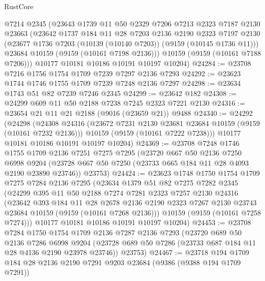 \begin{lexlean}{RustCore}
\begin{coremodule}
      @7214
      @2345
      (@23643
        @1739
        @11
        @50
        @2329
        @7206
        @7213
        @2323
        @7187
        @2130
        @23663
        (@23642
          @1737
          @184
          @11
          @28
          @7203
          @2136
          @2190
          @2323
          @7197
          @2130
          (@23677 @1736 @7203 (@10139 (@10140 @7203)) (@9159 (@10145 @1736 @11)))
          @23684
          @10159
          (@9159 (@10161 @7198 @2136)))
        @10159
        (@9159 (@10161 @7188 @7206)))
      @10177
      @10181
      @10186
      @10191
      @10197
      @10204)
@24284 := @23708 @7216 @1756 @1754 @1709 @7239 @7297 @2136 @7293
@24292 := @23623 @1744 @1746 @1755 @1709 @7239 @7248 @2136 @7297
@24298 := @23634 @1743 @51 @82 @7239 @7246 @2345
@24299 := @23642 @182
@24308 := @24299 @609 @11 @50 @2188 @7238 @7245 @2323 @7221 @2130
@24316 := @23654 @21 @11 @21 @2188 (@9016 (@23659 @21)) @9488
@24340 := @24292
    (@24298
      (@24308
        @24316
        (@23672 @7231 @2130 @23681 @23684 @10159 (@9159 (@10161 @7232 @2136)))
        @10159
        (@9159 (@10161 @7222 @7238)))
      @10177
      @10181
      @10186
      @10191
      @10197
      @10204)
@24369 := @23708
    @7248
    @1746
    @1755
    @1709
    @2136
    @7251
    @7275
    @7295
    (@23720
      @667
      @50
      @2136
      @7250
      @6998
      @9204
      (@23728 @667 @50 @7250 (@23733 @665 @184 @11 @28 @4093 @2190 @23890 @23746))
      @23753)
@24424 := @23623
    @1748
    @1750
    @1754
    @1709
    @7275
    @7284
    @2136
    @7295
    (@23634
      @1379
      @51
      @82
      @7275
      @7282
      @2345
      (@24299
        @395
        @11
        @50
        @2188
        @7274
        @7281
        @2323
        @7257
        @2130
        @24316
        (@23642
          @393
          @184
          @11
          @28
          @2678
          @2136
          @2190
          @2323
          @7267
          @2130
          @23743
          @23684
          @10159
          (@9159 (@10161 @7268 @2136)))
        @10159
        (@9159 (@10161 @7258 @7274)))
      @10177
      @10181
      @10186
      @10191
      @10197
      @10204)
@24453 := @23708
    @7284
    @1750
    @1754
    @1709
    @2136
    @7287
    @2136
    @7293
    (@23720
      @689
      @50
      @2136
      @7286
      @6998
      @9204
      (@23728 @689 @50 @7286 (@23733 @687 @184 @11 @28 @4136 @2190 @23978 @23746))
      @23753)
@24467 := @23718 @194 @1709 @184 @28 @2136 @2190 @7291 @9203 @23684 (@9386 (@9388 @194 @1709 @7291))

\end{coremodule}
\end{lexlean}
